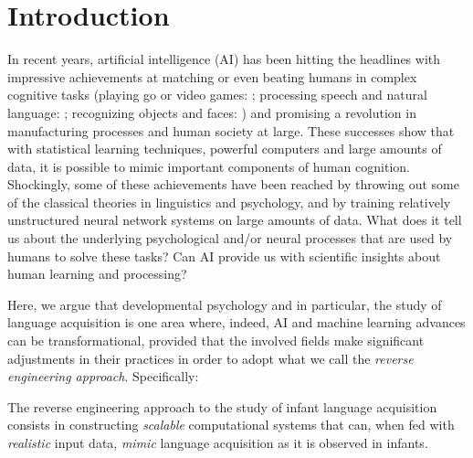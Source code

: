 \documentclass[jou,apacite]{apa6}
\begin{document}
\setcounter{secnumdepth}{2} %



            

\section{Introduction}\label{section:intro}


In recent years, artificial intelligence (AI) has been hitting the headlines with impressive achievements at matching or even beating humans in complex cognitive tasks 
(playing go or video games: ; processing speech and natural language: ; recognizing objects and faces: ) and promising a revolution in manufacturing processes and human society at large. These successes 
show that with statistical learning techniques, powerful computers and large amounts of data, it is possible to mimic important components of human cognition. 
Shockingly, some of these achievements have been reached by throwing out some of the classical theories in linguistics and psychology, and by training relatively unstructured neural network systems on large amounts of data. 
What does it tell us about the underlying psychological and/or neural processes that are used by humans to solve these tasks? Can AI provide us with scientific insights about human learning and processing?  


Here, we argue that developmental psychology and in particular, the study of language acquisition is one area where, indeed, AI and machine learning advances can be transformational, provided that the involved fields make significant adjustments in their practices in order to adopt what we call the \textit{reverse engineering approach}. Specifically: 


\begin{displayquote}
The reverse engineering approach to the study of infant language acquisition consists in constructing \textit{scalable} computational systems that can, when fed with \textit{realistic} input data, \textit{mimic} language acquisition as it is observed in infants. 
\end{displayquote}
\end{document}
